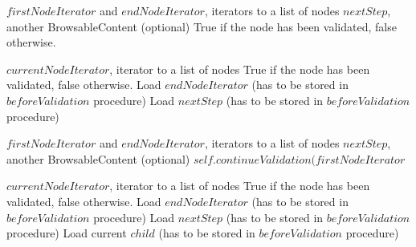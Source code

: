 \begin{algorithm}[H]
\caption{}
\begin{algorithmic}
\REQUIRE $firstNodeIterator$ and $endNodeIterator$, iterators to a list of nodes
\REQUIRE $nextStep$, another BrowsableContent (optional)
\ENSURE True if the node has been validated, false otherwise.
	\RETURN \TRUE
\ELSE
		\STATE \browseDown
	\ENDWHILE
		\RETURN \TRUE
	\ELSE
		\RETURN \FALSE
	\ENDIF
\ENDIF
\end{algorithmic}
\end{algorithm}

\begin{algorithm}[H]
\caption{}
\begin{algorithmic}
\REQUIRE $currentNodeIterator$, iterator to a list of nodes
\ENSURE True if the node has been validated, false otherwise.
\STATE Load $endNodeIterator$ (has to be stored in $beforeValidation$ procedure)
\STATE Load $nextStep$ (has to be stored in $beforeValidation$ procedure)
\RETURN \browseUp
\end{algorithmic}
\end{algorithm}

\begin{algorithm}[H]
\caption{}
\begin{algorithmic}
\REQUIRE $firstNodeIterator$ and $endNodeIterator$, iterators to a list of nodes
\REQUIRE $nextStep$, another BrowsableContent (optional)
\STATE {}
\RETURN $self.continueValidation(firstNodeIterator$ 
\end{algorithmic}
\end{algorithm}

\begin{algorithm}[H]
\caption{}
\begin{algorithmic}
\REQUIRE $currentNodeIterator$, iterator to a list of nodes
\ENSURE True if the node has been validated, false otherwise.
\STATE Load $endNodeIterator$ (has to be stored in $beforeValidation$ procedure)
\STATE Load $nextStep$ (has to be stored in $beforeValidation$ procedure)
\STATE Load current $child$ (has to be stored in $beforeValidation$ procedure)
\STATE {}
\RETURN \browseDown
\ELSE
\STATE {}
\RETURN \browseUp
\ENDIF
\end{algorithmic}
\end{algorithm}

